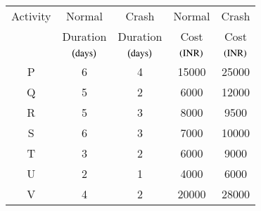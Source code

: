 \begin{center}
    \begin{tabular}{|c|c|c|c|c|} 
        \hline
            Activity & Normal & Crash & Normal & Crash \\
                     & Duration & Duration & Cost & Cost \\
                     & $\left(\text{days}\right)$ & $\left(\text{days}\right)$ & $\left(\text{INR}\right)$ & $\left(\text{INR}\right)$ \\
        \hline
            P & 6 & 4 & 15000 & 25000 \\
        \hline
            Q & 5 & 2 & 6000 & 12000 \\
        \hline
            R & 5 & 3 & 8000 & 9500 \\
        \hline
            S & 6 & 3 & 7000 & 10000 \\
        \hline
	    T & 3 & 2 & 6000 & 9000 \\
	\hline
	    U & 2 & 1 & 4000 & 6000 \\
	\hline
            V & 4 & 2 & 20000 & 28000 \\
	\hline
    \end{tabular}
\end{center}
